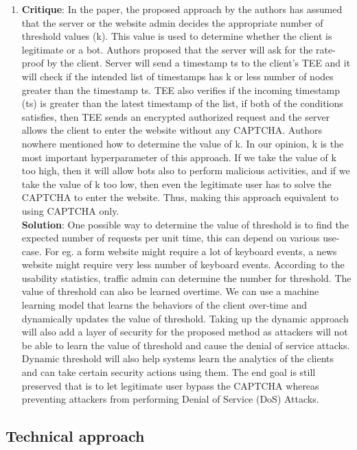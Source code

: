 \documentclass[runningheads,10pt]{llncs}
\begin{document}
\begin{enumerate}
		\item \textbf{Critique}: In the paper, the proposed approach by the authors has assumed that the server or the website admin decides the appropriate number of threshold values (k). This value is used to determine whether the client is legitimate or a bot. Authors proposed that the server will ask for the rate-proof by the client. Server will send a timestamp ts to the client’s TEE and it will check if the intended list of timestamps has k or less number of nodes greater than the timestamp ts. TEE also verifies if the incoming timestamp (ts) is greater than the latest timestamp of the list, if both of the conditions satisfies, then TEE sends an encrypted authorized request and the server allows the client to enter the website without any CAPTCHA. Authors nowhere mentioned how to determine the value of k. In our opinion, k is the most important hyperparameter of this approach. If we take the value of k too high, then it will allow bots also to perform malicious activities, and if we take the value of k too low, then even the legitimate user has to solve the CAPTCHA to enter the website. Thus, making this approach equivalent to using CAPTCHA only.\\

		\textbf{Solution}: One possible way to determine the value of threshold is to find the expected number of requests per unit time, this can depend on various use-case. For eg. a form website might require a lot of keyboard events, a news website might require very less number of keyboard events. According to the usability statistics, traffic admin can determine the number for threshold. The value of threshold can also be learned overtime. We can use a machine learning model that learns the behaviors of the client over-time and dynamically updates the value of threshold. Taking up the dynamic approach will also add a layer of security for the proposed method as attackers will not be able to learn the value of threshold and cause the denial of service attacks. Dynamic threshold will also help systems learn the analytics of the clients and can take certain security actions using them. The end goal is still preserved that is to let legitimate user bypass the CAPTCHA whereas preventing attackers from performing Denial of Service (DoS) Attacks.\\


	\end{enumerate}

	\subsection{Technical approach  \label{sec2}}
\end{document}
